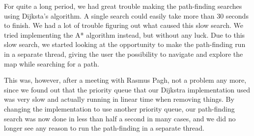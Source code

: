 For quite a long period, we had great trouble making the path-finding searches using Dijksta's algorithm. A single search could easily take more than 30 seconds to finish. We had a lot of trouble figuring out what caused this slow search. We tried implementing the A* algorithm instead, but without any luck. Due to this slow search, we started looking at the opportunity to make the path-finding run in a separate thread, giving the user the possibility to navigate and explore the map while searching for a path. 

This was, however, after a meeting with Rasmus Pagh, not a problem any more, since we found out that the priority queue that our Dijkstra implementation used was very slow and actually running in linear time when removing things. By changing the implementation to use another priority queue, our path-finding search was now done in less than half a second in many cases, and we did no longer see any reason to run the path-finding in a separate thread.
